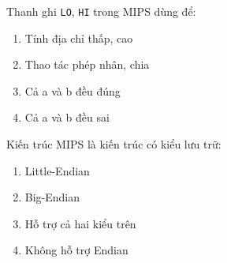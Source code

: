 \begin{exercise}
{\arialfont Thanh ghi \texttt{LO}, \texttt{HI} trong MIPS dùng để:
\begin{enumerate}[label=\alph*.]
\item Tính địa chỉ thấp, cao
\item Thao tác phép nhân, chia
\item Cả a và b đều đúng
\item Cả a và b đều sai
\end{enumerate}}
\end{exercise}

\begin{exercise}
{\arialfont Kiến trúc MIPS là kiến trúc có kiểu lưu trữ:
\begin{enumerate}[label=\alph*.]
\item Little-Endian
\item Big-Endian
\item Hỗ trợ cả hai kiểu trên
\item Không hỗ trợ Endian
\end{enumerate}}
\end{exercise}

